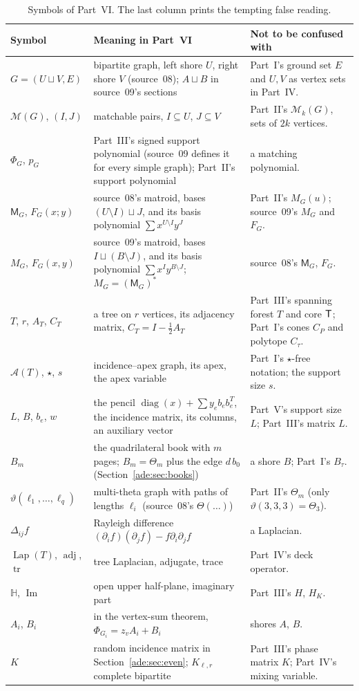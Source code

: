 \documentclass[11pt]{article}
\numberwithin{equation}{section}
\theoremstyle{definition}
\newcommand{\PM}{\mathcal M}
\newcommand{\diag}{\operatorname{diag}}
\newcommand{\HH}{\mathbb H}
\newcommand{\adj}{\operatorname{adj}}
\newcommand{\tr}{\operatorname{tr}}
\newcommand{\Lap}{\operatorname{Lap}}
\newcommand{\calA}{\mathcal A}
\newcommand{\del}{\Delta}
\newcommand{\im}{\operatorname{Im}}
\begin{document}
\begin{table}[tbp]
\centering\footnotesize
\caption{Symbols of Part~VI. The last column prints the tempting false
reading.}
\label{ade:tab:notation}
\begin{tabularx}{\textwidth}{@{}>{\raggedright}p{}>{\raggedright}p{}Y@{}}
\toprule
Symbol & Meaning in Part~VI & Not to be confused with\\
\midrule
$G=(U\sqcup V,E)$ & bipartite graph, left shore $U$, right shore $V$
 (source~08); $A\sqcup B$ in source~09's sections & Part~I's ground set $E$
 and $U,V$ as vertex sets in Part~IV.\\
$\PM(G)$, $(I,J)$ & matchable pairs, $I\subseteq U$, $J\subseteq V$ & Part~II's
 $\PM_k(G)$, sets of $2k$ vertices.\\
$\Phi_G$, $p_G$ & Part~III's signed support polynomial (source~09 defines it
 for every simple graph); Part~II's support polynomial & a matching polynomial.\\
$\mathsf M_G$, $F_G(x;y)$ & source~08's matroid, bases $(U\setminus I)\sqcup J$,
 and its basis polynomial $\sum x^{U\setminus I}y^J$ & Part~II's $M_G(u)$;
 source~09's $M_G$ and $F_G$.\\
$M_G$, $F_G(x,y)$ & source~09's matroid, bases $I\sqcup(B\setminus J)$, and
 its basis polynomial $\sum x^Iy^{B\setminus J}$; $M_G=(\mathsf M_G)^*$ &
 source~08's $\mathsf M_G$, $F_G$.\\
$T$, $r$, $A_T$, $C_T$ & a tree on $r$ vertices, its adjacency matrix,
 $C_T=I-\frac12A_T$ & Part~III's spanning forest $T$ and core $\mathsf T$; Part~I's
 cones $C_P$ and polytope $C_\tau$.\\
$\calA(T)$, $\star$, $s$ & incidence--apex graph, its apex, the apex
 variable & Part~I's $\star$-free notation; the support size $s$.\\
$L$, $B$, $b_e$, $w$ & the pencil $\diag(x)+\sum y_eb_eb_e^T$, the incidence
 matrix, its columns, an auxiliary vector & Part~V's support size $L$;
 Part~III's matrix $L$.\\
$B_m$ & the quadrilateral book with $m$ pages; $B_m=\Theta_m$ plus the edge
 $d\,b_0$ (Section~\ref{ade:sec:books}) & a shore $B$; Part~I's $B_\tau$.\\
$\vartheta(\ell_1,\ldots,\ell_q)$ & multi-theta graph with paths of lengths
 $\ell_i$ (source~08's $\Theta(\ldots)$) & Part~II's $\Theta_m$ (only
 $\vartheta(3,3,3)=\Theta_3$).\\
$\del_{ij}f$ & Rayleigh difference $(\partial_if)(\partial_jf)-f\partial_i\partial_jf$
 & a Laplacian.\\
$\Lap(T)$, $\adj$, $\tr$ & tree Laplacian, adjugate, trace & Part~IV's
 deck operator.\\
$\HH$, $\im$ & open upper half-plane, imaginary part & Part~III's $H$, $H_K$.\\
$A_i$, $B_i$ & in the vertex-sum theorem, $\Phi_{G_i}=z_vA_i+B_i$ & shores
 $A$, $B$.\\
$K$ & random incidence matrix in Section~\ref{ade:sec:even}; $K_{\ell,r}$
 complete bipartite & Part~III's phase matrix $K$; Part~IV's mixing variable.\\
\bottomrule
\end{tabularx}
\end{table}
\end{document}
